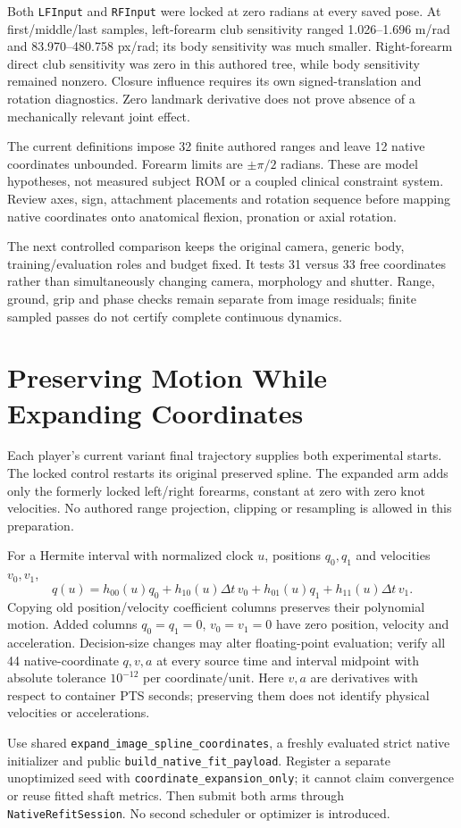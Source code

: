 \documentclass[11pt,letterpaper]{article}
\newcommand{\code}[1]{\nolinkurl{#1}}\newcommand{\hash}[1]{{\footnotesize\nolinkurl{#1}}}
\newcommand{\chapterpage}[1]{\clearpage\section{#1}}
\begin{document}
Both \code{LFInput} and \code{RFInput} were locked at zero radians at every
saved pose. At first/middle/last samples, left-forearm club sensitivity ranged
1.026--1.696 m/rad and 83.970--480.758 px/rad; its body sensitivity was much
smaller. Right-forearm direct club sensitivity was zero in this authored tree,
while body sensitivity remained nonzero. Closure influence requires its own
signed-translation and rotation diagnostics. Zero landmark derivative does not
prove absence of a mechanically relevant joint effect.

The current definitions impose 32 finite authored ranges and leave 12 native
coordinates unbounded. Forearm limits are $\pm\pi/2$ radians. These are model
hypotheses, not measured subject ROM or a coupled clinical constraint system.
Review axes, sign, attachment placements and rotation sequence before mapping
native coordinates onto anatomical flexion, pronation or axial rotation.

The next controlled comparison keeps the original camera, generic body,
training/evaluation roles and budget fixed. It tests 31 versus 33 free
coordinates rather than simultaneously changing camera, morphology and shutter.
Range, ground, grip and phase checks remain separate from image residuals;
finite sampled passes do not certify complete continuous dynamics.
\chapterpage{Preserving Motion While Expanding Coordinates}
Each player's current variant final trajectory supplies both experimental
starts. The locked control restarts its original preserved spline. The expanded
arm adds only the formerly locked left/right forearms, constant at zero with
zero knot velocities. No authored range projection, clipping or resampling is
allowed in this preparation.

For a Hermite interval with normalized clock $u$, positions $q_0,q_1$ and
velocities $v_0,v_1$,
\[
q(u)=h_{00}(u)q_0+h_{10}(u)\Delta t\,v_0+h_{01}(u)q_1+h_{11}(u)\Delta t\,v_1.
\]
Copying old position/velocity coefficient columns preserves their polynomial
motion. Added columns $q_0=q_1=0$, $v_0=v_1=0$ have zero position, velocity and
acceleration. Decision-size changes may alter floating-point evaluation;
verify all 44 native-coordinate $q,v,a$ at every source time and interval
midpoint with absolute tolerance $10^{-12}$ per coordinate/unit. Here $v,a$
are derivatives with respect to container PTS seconds; preserving them does
not identify physical velocities or accelerations.

Use shared \code{expand_image_spline_coordinates}, a freshly evaluated strict
native initializer and public \code{build_native_fit_payload}. Register a
separate unoptimized seed with \code{coordinate_expansion_only}; it cannot
claim convergence or reuse fitted shaft metrics. Then submit both arms through
\code{NativeRefitSession}. No second scheduler or optimizer is introduced.
\end{document}
